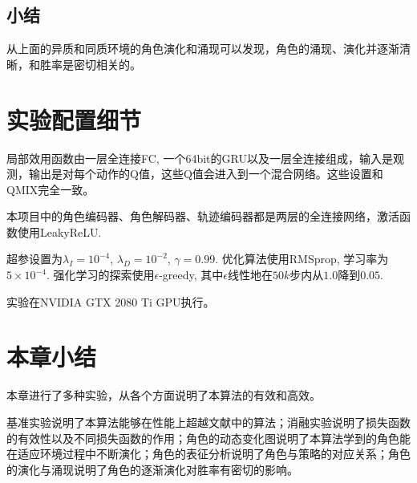 \subsection{小结}
从上面的异质和同质环境的角色演化和涌现可以发现，角色的涌现、演化并逐渐清晰，和胜率是密切相关的。

\section{实验配置细节}\label{sec:exp-detail}
局部效用函数由一层全连接FC, 一个64bit的GRU以及一层全连接组成，输入是观测，输出是对每个动作的Q值，这些Q值会进入到一个混合网络。这些设置和QMIX完全一致。

本项目中的角色编码器、角色解码器、轨迹编码器都是两层的全连接网络，激活函数使用LeakyReLU. 

超参设置为$\lambda_I=10^{-4}$, $\lambda_D=10^{-2}$, $\gamma=0.99$. 优化算法使用RMSprop, 学习率为$5\times 10^{-4}$. 强化学习的探索使用$\epsilon$-greedy, 其中$\epsilon$线性地在$50k$步内从$1.0$降到$0.05$. 

实验在NVIDIA GTX 2080 Ti GPU执行。

\section{本章小结}

本章进行了多种实验，从各个方面说明了本算法的有效和高效。

基准实验说明了本算法能够在性能上超越文献中的算法；消融实验说明了损失函数的有效性以及不同损失函数的作用；角色的动态变化图说明了本算法学到的角色能在适应环境过程中不断演化；角色的表征分析说明了角色与策略的对应关系；角色的演化与涌现说明了角色的逐渐演化对胜率有密切的影响。